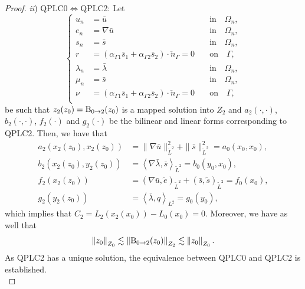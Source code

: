 \begin{proof}
\noindent \textit{ii}) QPLC0$\iff$QPLC2: Let
\begin{equation}
\left\lbrace
\begin{array}{rll}
    u_n       &= \bar{u}                                        & \quad \textrm{in} \quad \Omega_n,\\
    e_n       &= \nabla \bar{u}                                 & \quad \textrm{in} \quad \Omega_n,\\
    s_n       &= \bar{s}                                        & \quad \textrm{in} \quad \Omega_n,\\
    r         &= (\alpha_{\Gamma 1}\bar{s}_1+\alpha_{\Gamma 2}\bar{s}_2) \cdot \check{n}_\Gamma = 0   & \quad \textrm{on} \quad \Gamma,\\
    \lambda_n &= \bar{\lambda}                                  & \quad \textrm{in} \quad \Omega_n,\\
    \mu_n     &= \bar{s}                                        & \quad \textrm{in} \quad \Omega_n,\\
    \nu       &= (\alpha_{\Gamma 1}\bar{s}_1+\alpha_{\Gamma 2}\bar{s}_2) \cdot \check{n}_\Gamma = 0   & \quad \textrm{on} \quad \Gamma,\\
\end{array}
\right.
\end{equation}
be such that $z_2(z_0) = \operatorname{B}_{0 \to 2} (z_0)$ is a mapped solution into $Z_2$
and $a_2(\cdot,\cdot)$, $b_2(\cdot, \cdot)$, $f_2(\cdot)$ and $g_2(\cdot)$ be the bilinear and linear forms corresponding to QPLC2.
Then, we have that
\begin{align}
a_2(x_2(z_0), x_2(z_0)) &= \|\nabla \bar{u}\|^2_{\tilde{L}^2}+\|\bar{s}\|^2_{\tilde{L}^2} = a_0(x_0, x_0),\\
b_2(x_2(z_0), y_2(z_0)) &= \left\langle \nabla \bar{\lambda}, \bar{s} \right\rangle_{\tilde{L}^2} = b_0(y_0, x_0),\\
f_2(x_2(z_0))   &= \left( \nabla \bar{u}, \tilde{e}\right )_{\tilde{L}^2} + \left( \bar{s}, \tilde{s}\right)_{\tilde{L}^2} = f_0(x_0), \\
g_2(y_2(z_0))   &= \left\langle \bar{\lambda} , q \right\rangle_{L^2}  = g_0(y_0),
\end{align}
which implies that $C_2 = L_2(x_2(x_0))-L_0(x_0) = 0$.
Moreover, we have as well that
\begin{equation}
\left\|z_0\right\|_{Z_0}
\lesssim
\left\|\operatorname{B}_{0 \to 2}(z_0)\right\|_{Z_2}
\lesssim
\left\|z_0\right\|_{Z_0}.
\end{equation}
As QPLC2 has a unique solution, the equivalence between QPLC0 and QPLC2 is established.\\ 


\end{proof}

